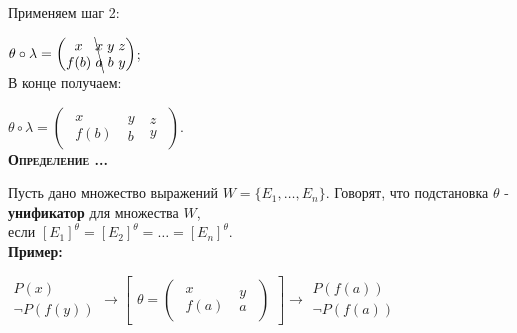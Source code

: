 \documentclass[18pt, a4paper]{extarticle}
\newcounter{par}
\newcounter{spar}
\newcounter{zap}
\newcommand{\opr}{\textbf{\textsc{Определение \thepar.\if\thespar1\thespar.\fi\thezap.\;}}\stepcounter{zap}}
\newcommand{\primer}{\textbf{Пример:\;}}
\newcommand{\lot}[3]{#1_#2,\dots,#1_#3}
\begin{document}
Применяем шаг 2:

$\theta\circ\lambda=\begin{pmatrix}\begin{matrix}x\\f(b)\end{matrix}\;\bcancel{\begin{matrix}x\\a\end{matrix}}\;\begin{matrix}y\\b\end{matrix}\;\begin{matrix}z\\y\end{matrix}\end{pmatrix}$;\\

В конце получаем:

$\theta\circ\lambda=\begin{pmatrix}\begin{matrix}x\\f(b)\end{matrix}\;\begin{matrix}y\\b\end{matrix}\;\begin{matrix}z\\y\end{matrix}\end{pmatrix}$.\\

\opr 

Пусть дано множество выражений $W=\{\lot E 1 n\}$. Говорят, что подстановка $\theta$ - \textbf{унификатор} для множества $W$, \\
если $[E_1]^\theta=[E_2]^\theta=\dots=[E_n]^\theta$.\\

\primer

$\begin{matrix}P(x)\\\lnot P(f(y))\end{matrix}\to\begin{bmatrix}\theta=\begin{pmatrix}\begin{matrix}x\\f(a)\end{matrix}\;\begin{matrix}y\\a\end{matrix}\end{pmatrix}\end{bmatrix}\to\begin{matrix}P(f(a))\\\lnot P(f(a))\end{matrix}$\\
\end{document}
